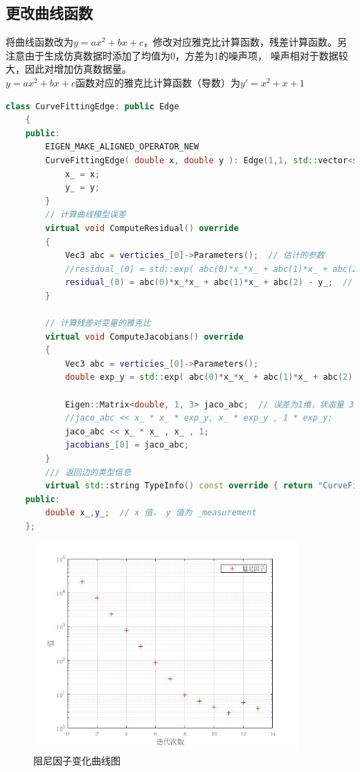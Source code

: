 \documentclass[UTF8]{ctexart}
\begin{document}
\subsection{更改曲线函数}
\indent 将曲线函数改为$y=ax^2+bx+c$，修改对应雅克比计算函数，残差计算函数。另注意由于生成仿真数据时添加了均值为0，方差为1的噪声项，
噪声相对于数据较大，因此对增加仿真数据量。\\
\indent $y=ax^2+bx+c$函数对应的雅克比计算函数（导数）为$y'=x^2+x+1$
\begin{lstlisting}[language={c++}]
    class CurveFittingEdge: public Edge
    {
    public:
        EIGEN_MAKE_ALIGNED_OPERATOR_NEW
        CurveFittingEdge( double x, double y ): Edge(1,1, std::vector<std::string>{"abc"}) {
            x_ = x;
            y_ = y;
        }
        // 计算曲线模型误差
        virtual void ComputeResidual() override
        {
            Vec3 abc = verticies_[0]->Parameters();  // 估计的参数
            //residual_(0) = std::exp( abc(0)*x_*x_ + abc(1)*x_ + abc(2) ) - y_;  // 构建残差
            residual_(0) = abc(0)*x_*x_ + abc(1)*x_ + abc(2) - y_;  // 构建残差 
        }
    
        // 计算残差对变量的雅克比
        virtual void ComputeJacobians() override
        {
            Vec3 abc = verticies_[0]->Parameters();
            double exp_y = std::exp( abc(0)*x_*x_ + abc(1)*x_ + abc(2) );
    
            Eigen::Matrix<double, 1, 3> jaco_abc;  // 误差为1维，状态量 3 个，所以是 1x3 的雅克比矩阵
            //jaco_abc << x_ * x_ * exp_y, x_ * exp_y , 1 * exp_y;
            jaco_abc << x_ * x_ , x_ , 1;
            jacobians_[0] = jaco_abc;
        }
        /// 返回边的类型信息
        virtual std::string TypeInfo() const override { return "CurveFittingEdge"; }
    public:
        double x_,y_;  // x 值， y 值为 _measurement
    };  
\end{lstlisting}
\begin{figure}[H]
\centering
\includegraphics[width=0.9\textwidth]{mu2_g.jpg}    
\caption{阻尼因子变化曲线图}
\label{img1}
\end{figure}
\end{document}

